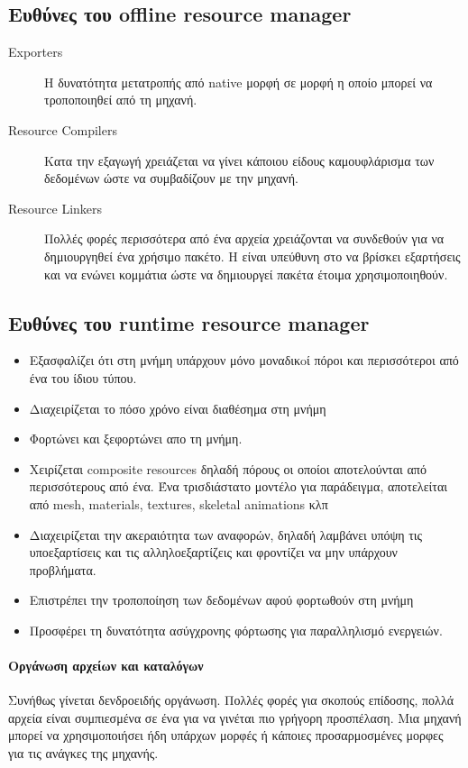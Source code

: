 \subsection{Ευθύνες του offline resource manager}
\begin{description}
\item [Exporters]  Η δυνατότητα μετατροπής από native μορφή σε μορφή η οποίο μπορεί να τροποποιηθεί από τη μηχανή.
\item [Resource Compilers] Κατα την εξαγωγή χρειάζεται να γίνει κάποιου είδους καμουφλάρισμα των δεδομένων ώστε να συμβαδίζουν με την μηχανή.
\item [Resource Linkers] Πολλές φορές περισσότερα από ένα αρχεία χρειάζονται να συνδεθούν για να δημιουργηθεί ένα χρήσιμο πακέτο. Η είναι υπεύθυνη στο να βρίσκει εξαρτήσεις και να ενώνει κομμάτια ώστε να δημιουργεί πακέτα έτοιμα χρησιμοποιηθούν.
\end{description}

\subsection{Ευθύνες του runtime resource manager}
\begin{itemize}
\item Εξασφαλίζει ότι στη μνήμη υπάρχουν μόνο μοναδικoί πόροι και περισσότεροι από ένα του ίδιου τύπου.
\item Διαχειρίζεται το πόσο χρόνο είναι διαθέσημα στη μνήμη
\item Φορτώνει και ξεφορτώνει απο τη μνήμη.
\item Χειρίζεται composite resources δηλαδή πόρους οι οποίοι αποτελούνται από περισσότερους από ένα. Ένα τρισδιάστατο μοντέλο για παράδειγμα, αποτελείται από mesh, materials, textures, skeletal animations κλπ
\item Διαχειρίζεται την ακεραιότητα των αναφορών, δηλαδή λαμβάνει υπόψη τις υποεξαρτίσεις και τις αλληλοεξαρτίζεις και φροντίζει να μην υπάρχουν προβλήματα.
\item Επιστρέπει την τροποποίηση των δεδομένων αφού φορτωθούν στη μνήμη
\item Προσφέρει τη δυνατότητα ασύγχρονης φόρτωσης για παραλληλισμό ενεργειών.
\end{itemize}

\paragraph{Οργάνωση αρχείων και καταλόγων}
Συνήθως γίνεται δενδροειδής οργάνωση. Πολλές φορές για σκοπούς επίδοσης, πολλά αρχεία είναι συμπιεσμένα σε ένα για να γινέται πιο γρήγορη προσπέλαση. Μια μηχανή μπορεί να χρησιμοποιήσει ήδη υπάρχων μορφές ή κάποιες προσαρμοσμένες μορφες για τις ανάγκες της μηχανής. 

